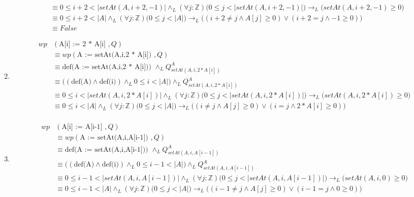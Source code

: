 \documentclass{article}
\begin{document}
\begin{enumerate}[label=\alph*)]
\begin{align*}
			&\equiv 0\leq i+2<|setAt(A,i+2,-1)| \wedge_L (\forall j :\mathbb{Z})
				\Big(0 \leq j < |setAt(A,i+2,-1)|\Big) \rightarrow_L  
				\Big(setAt(A,i+2,-1) \geq 0\Big)\\
			&\equiv 0\leq i+2<|A| \wedge_L (\forall j :\mathbb{Z})
				\Big(0 \leq j < |A|\Big) \rightarrow_L  
				\Big((i+2\neq j \wedge A[j] \geq 0)\vee(i+2=j\wedge -1\geq 0)\Big)\\
			&\equiv False
		\end{align*}
	\item
		\begin{align*}
		wp&(\textrm{A[i] := 2 * A[i] },Q) \\
			&\equiv wp(\textrm{A := setAt(A,i,2 * A[i]) },Q) \\
			&\equiv \textrm{def(A := setAt(A,i,2 * A[i])) }\wedge_L Q_{setAt(A,i,2 * A[i])}^{A} \\
			&\equiv \Big((\textrm{def(A)}\wedge \textrm{def(i)})\wedge_L 0\leq i<|A|\Big) 
				\wedge_LQ_{setAt(A,i,2 * A[i])}^{A} \\
			&\equiv 0\leq i<|setAt(A,i,2 * A[i])| \wedge_L (\forall j :\mathbb{Z})
				\Big(0 \leq j < |setAt(A,i,2 * A[i])|\Big) \rightarrow_L  
				\Big(setAt(A,i,2 * A[i]) \geq 0\Big)\\
			&\equiv 0\leq i<|A| \wedge_L (\forall j :\mathbb{Z})
				\Big(0 \leq j < |A|\Big) \rightarrow_L  
				\Big((i\neq j \wedge A[j] \geq 0)\vee(i=j\wedge 2*A[i]\geq 0)\Big)\\
		\end{align*}
	\item
		\begin{align*}
		wp&(\textrm{A[i] := A[i-1] },Q) \\
			&\equiv wp(\textrm{A := setAt(A,i,A[i-1]) },Q) \\
			&\equiv \textrm{def(A := setAt(A,i,A[i-1])) }\wedge_L Q_{setAt(A,i,A[i-1])}^{A} \\
			&\equiv \Big((\textrm{def(A)}\wedge \textrm{def(i)})\wedge_L 0\leq i-1<|A|\Big) 
				\wedge_LQ_{setAt(A,i,A[i-1])}^{A} \\
			&\equiv 0\leq i-1<|setAt(A,i,A[i-1])| \wedge_L (\forall j :\mathbb{Z})
				\Big(0 \leq j < |setAt(A,i,A[i-1])|\Big) \rightarrow_L  
				\Big(setAt(A,i,0) \geq 0\Big)\\
			&\equiv 0\leq i-1<|A| \wedge_L (\forall j :\mathbb{Z})
				\Big(0 \leq j < |A|\Big) \rightarrow_L  
				\Big((i-1\neq j \wedge A[j] \geq 0)\vee(i-1=j\wedge 0\geq 0)\Big)\\
		\end{align*}
\end{enumerate}
\end{document}
